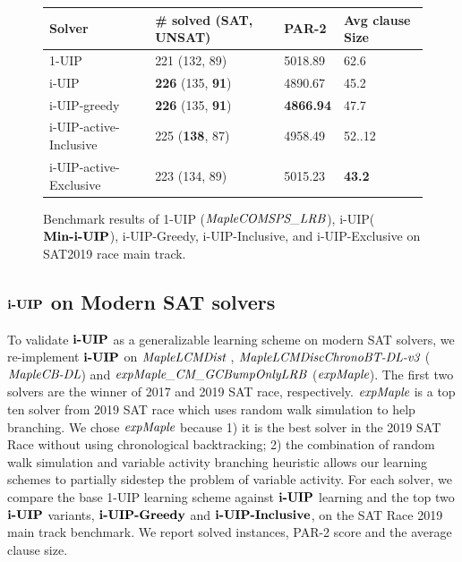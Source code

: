 \begin{figure} 
\begin{center}
\begin{tabular}{ | m{3.5cm} | m{4cm}| m{2cm} | m{2.75cm} |  } 
\hline
Solver & \# solved (SAT, UNSAT) & PAR-2 & Avg clause Size \\ 
\hline
1-UIP & 221 (132, 89)  & 5018.89 & 62.6  \\ 
\hline
i-UIP & \textbf{226} (135, \textbf{91}) & 4890.67 & 45.2 \\ 
\hline
i-UIP-greedy & \textbf{226} (135, \textbf{91})  & \textbf{4866.94} & 47.7 \\
\hline
i-UIP-active-Inclusive & 225 (\textbf{138}, 87) & 4958.49 & 52..12 \\
\hline
i-UIP-active-Exclusive & 223 (134, 89) & 5015.23 & \textbf{43.2} \\
\hline
\end{tabular}
\end{center}
\caption{Benchmark results of 1-UIP ($\textit{MapleCOMSPS\_LRB}$), i-UIP($\textbf{Min-i-UIP}$), i-UIP-Greedy,
i-UIP-Inclusive, and i-UIP-Exclusive on SAT2019 race main track.}
\label{fig:t4}
\end{figure}




\subsection{$\textbf{i-UIP}$ on Modern SAT solvers}
To validate $\textbf{i-UIP}$ as a generalizable learning scheme on modern SAT solvers, we re-implement $\textbf{i-UIP}$ on $\textit{MapleLCMDist}$ \cite{},  $\textit{MapleLCMDiscChronoBT-DL-v3}$ \cite{}($\textit{MapleCB-DL}$) and $\textit{expMaple\_CM\_GCBumpOnlyLRB}$\cite{} ($\textit{expMaple}$).  
The first two solvers are the winner of 2017 and 2019 SAT race, respectively.  $\textit{expMaple}$ is a top ten solver from 2019 SAT race which uses random walk simulation to help branching. We chose $\textit{expMaple}$ because 1) it is the best solver in the 2019 SAT Race without using chronological backtracking; 2) the combination of random walk simulation and variable activity branching heuristic allows our learning schemes to partially sidestep the problem of variable activity. For each solver, we compare the base 1-UIP learning scheme against $\textbf{i-UIP}$ learning and the top two $\textbf{i-UIP}$ variants, $\textbf{i-UIP-Greedy}$ and $\textbf{i-UIP-Inclusive}$, on the SAT Race 2019 main track benchmark. We report solved instances, PAR-2 score and the average clause size.

